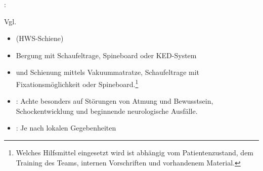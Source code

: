 \label{m:ws-trauma-verdacht}
: 


Vgl. 
\begin{itemize}
  \item {} (HWS-Schiene)
  \item Bergung mit Schaufeltrage, Spineboard oder
  KED-System
  \item {} und Schienung mittels Vakuummatratze, Schaufeltrage mit
  Fixationsmöglichkeit oder Spineboard.\footnote{Welches Hilfsmittel
  eingesetzt wird ist abhängig vom Patientenzustand,
  dem Training des Teams, internen Vorschriften und
  vorhandenem Material.}
  \item {}: Achte besonders auf Störungen
  von Atmung und Bewusstsein, Schockentwicklung und
  beginnende neurologische Ausfälle.
  \item {}: Je nach
  lokalen Gegebenheiten
\end{itemize}
